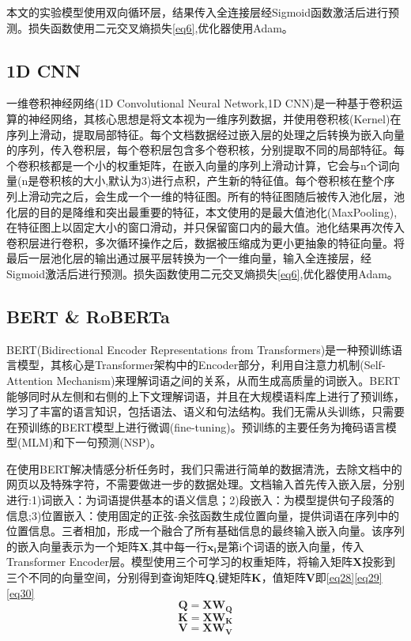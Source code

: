 \documentclass{article}
\begin{document}
本文的实验模型使用双向循环层，结果传入全连接层经Sigmoid函数激活后进行预测。损失函数使用二元交叉熵损失\eqref{eq6},优化器使用Adam。

\subsection{1D CNN}
一维卷积神经网络(1D Convolutional Neural Network,1D CNN)是一种基于卷积运算的神经网络，其核心思想是将文本视为一维序列数据，并使用卷积核(Kernel)在序列上滑动，提取局部特征。每个文档数据经过嵌入层的处理之后转换为嵌入向量的序列，传入卷积层，每个卷积层包含多个卷积核，分别提取不同的局部特征。每个卷积核都是一个小的权重矩阵，在嵌入向量的序列上滑动计算，它会与n个词向量(n是卷积核的大小,默认为3)进行点积，产生新的特征值。每个卷积核在整个序列上滑动完之后，会生成一个一维的特征图。所有的特征图随后被传入池化层，池化层的目的是降维和突出最重要的特征，本文使用的是最大值池化(MaxPooling),在特征图上以固定大小的窗口滑动，并只保留窗口内的最大值。池化结果再次传入卷积层进行卷积，多次循环操作之后，数据被压缩成为更小更抽象的特征向量。将最后一层池化层的输出通过展平层转换为一个一维向量，输入全连接层，经Sigmoid激活后进行预测。损失函数使用二元交叉熵损失\eqref{eq6},优化器使用Adam。

\subsection{BERT \& RoBERTa}
BERT(Bidirectional Encoder Representations from Transformers)是一种预训练语言模型，其核心是Transformer架构中的Encoder部分，利用自注意力机制(Self-Attention Mechanism)来理解词语之间的关系，从而生成高质量的词嵌入。BERT能够同时从左侧和右侧的上下文理解词语，并且在大规模语料库上进行了预训练，学习了丰富的语言知识，包括语法、语义和句法结构。我们无需从头训练，只需要在预训练的BERT模型上进行微调(fine-tuning)。预训练的主要任务为掩码语言模型(MLM)和下一句预测(NSP)。

在使用BERT解决情感分析任务时，我们只需进行简单的数据清洗，去除文档中的网页以及特殊字符，不需要做进一步的数据处理。文档输入首先传入嵌入层，分别进行:1)词嵌入：为词语提供基本的语义信息；2)段嵌入：为模型提供句子段落的信息;3)位置嵌入：使用固定的正弦-余弦函数生成位置向量，提供词语在序列中的位置信息。三者相加，形成一个融合了所有基础信息的最终输入嵌入向量。该序列的嵌入向量表示为一个矩阵$\boldsymbol{X}$,其中每一行$\boldsymbol{x_i}$是第i个词语的嵌入向量，传入Transformer Encoder层。模型使用三个可学习的权重矩阵，将输入矩阵$\boldsymbol{X}$投影到三个不同的向量空间，分别得到查询矩阵$\boldsymbol{Q}$,键矩阵$\boldsymbol{K}$，值矩阵$\boldsymbol{V}$即\eqref{eq28}\eqref{eq29}\eqref{eq30}
\begin{equation}
    \boldsymbol{Q}=\boldsymbol{XW_Q} \label{eq28}
\end{equation}
\begin{equation}
    \boldsymbol{K}=\boldsymbol{XW_K} \label{eq29}
\end{equation}
\begin{equation}
    \boldsymbol{V}=\boldsymbol{XW_V} \label{eq30}
\end{equation}
\end{document}
